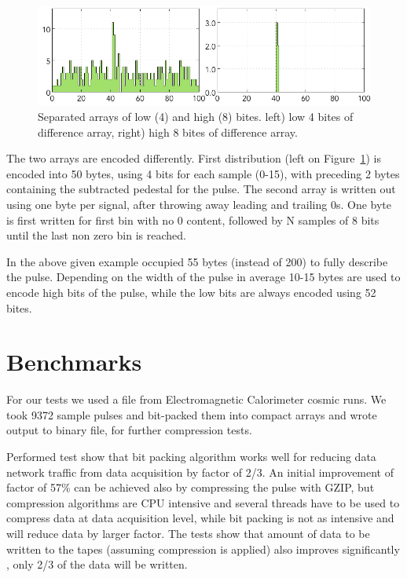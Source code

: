 \documentclass[12pt]{article}
\begin{document}
\begin{figure}[!ht]
\begin{center}

 \includegraphics[width=5in]{pics/fadc_pulse_bits.png}

 \caption {Separated arrays of low (4) and high (8) bites. left) low 4 bites of difference array,
 right) high 8 bites of difference array. }
 \label{FADC_PULSE_BITS}
 \end{center}
\end{figure}

The two arrays are encoded differently. First distribution (left on Figure~\ref{FADC_PULSE_BITS}) is encoded into 50 bytes, using 4 bits for each sample (0-15), with preceding 2 bytes containing the subtracted pedestal for the pulse. The second array is written out using one byte per signal, after
throwing away leading and trailing 0s. One byte is first written for first bin with no 0 content, followed
by N samples of 8 bits until the last non zero bin is reached.

In the above given example occupied 55 bytes (instead of 200) to fully describe the pulse.
Depending on the width of the pulse in average 10-15 bytes are used to encode high bits of 
the pulse, while the low bits are always encoded using 52 bites.

\section{Benchmarks}

For our tests we used a file from Electromagnetic Calorimeter cosmic runs. We took 9372 sample
pulses and bit-packed them into compact arrays and wrote output to binary file, for further 
compression tests.

Performed test show that bit packing algorithm works well for reducing data network traffic 
from data acquisition by factor of 2/3. An initial improvement of factor of 57\% can be achieved 
also by compressing the pulse with GZIP, but compression algorithms are CPU intensive and several
threads have to be used to compress data at data acquisition level, while bit packing is not as intensive
and will reduce data by larger factor. The tests show that amount of data to be written to the tapes 
(assuming compression is applied) also improves significantly , only 2/3 of the data will be written.
\end{document}
